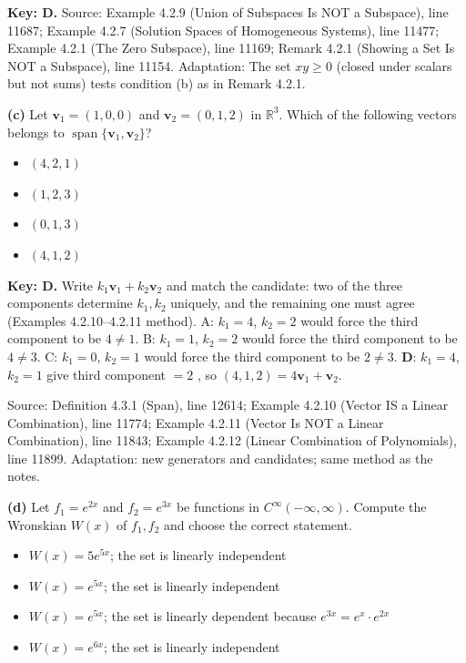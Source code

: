 \documentclass[11pt,a4paper]{article}
\newcommand{\Src}[1]{{\footnotesize\color{black!65}Source: #1}}
\begin{document}
\textbf{Key: D.} \Src{Example 4.2.9 (Union of Subspaces Is NOT a Subspace), line 11687; Example 4.2.7 (Solution Spaces of Homogeneous Systems), line 11477; Example 4.2.1 (The Zero Subspace), line 11169; Remark 4.2.1 (Showing a Set Is NOT a Subspace), line 11154. Adaptation: The set $xy\ge0$ (closed under scalars but not sums) tests condition (b) as in Remark 4.2.1.}\par
\textbf{(c)} Let $\mathbf{v}_1=(1,0,0)$ and $\mathbf{v}_2=(0,1,2)$ in $\mathbb{R}^3$. Which of the following vectors belongs to $\operatorname{span}\{\mathbf{v}_1,\mathbf{v}_2\}$?\par
\begin{itemize}[leftmargin=8mm,itemsep=0pt]\item[A] $(4,2,1)$\item[B] $(1,2,3)$\item[C] $(0,1,3)$\item[D$^{\ast}$] $(4,1,2)$\end{itemize}
\textbf{Key: D.} Write $k_1\mathbf{v}_1+k_2\mathbf{v}_2$ and match the candidate: two of the three components determine $k_1,k_2$ uniquely, and the remaining one must agree (Examples 4.2.10--4.2.11 method). A: $k_1=4$, $k_2=2$ would force the third component to be $4\neq1$. B: $k_1=1$, $k_2=2$ would force the third component to be $4\neq3$. C: $k_1=0$, $k_2=1$ would force the third component to be $2\neq3$. \textbf{D}: $k_1=4$, $k_2=1$ give third component $=2$ \checkmark, so $(4,1,2)=4\mathbf{v}_1+\mathbf{v}_2$.\par
\Src{Definition 4.3.1 (Span), line 12614; Example 4.2.10 (Vector IS a Linear Combination), line 11774; Example 4.2.11 (Vector Is NOT a Linear Combination), line 11843; Example 4.2.12 (Linear Combination of Polynomials), line 11899. Adaptation: new generators and candidates; same method as the notes.}\par
\textbf{(d)} Let $f_1=e^{2x}$ and $f_2=e^{3x}$ be functions in $C^{\infty}(-\infty,\infty)$. Compute the Wronskian $W(x)$ of $f_1,f_2$ and choose the correct statement.\par
\begin{itemize}[leftmargin=8mm,itemsep=0pt]\item[A] $W(x)=5e^{5x}$; the set is linearly independent\item[B$^{\ast}$] $W(x)=e^{5x}$; the set is linearly independent\item[C] $W(x)=e^{5x}$; the set is linearly dependent because $e^{3x}=e^{x}\cdot e^{2x}$\item[D] $W(x)=e^{6x}$; the set is linearly independent\end{itemize}
\end{document}
